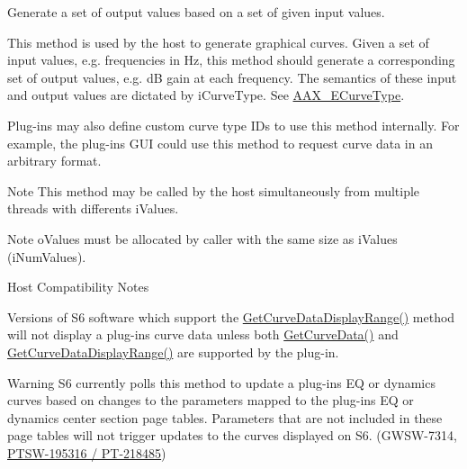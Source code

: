 Generate a set of output values based on a set of given input values. 

This method is used by the host to generate graphical curves. Given a set of input values, e.\+g. frequencies in Hz, this method should generate a corresponding set of output values, e.\+g. d\+B gain at each frequency. The semantics of these input and output values are dictated by {\ttfamily i\+Curve\+Type}. See \hyperlink{a00342_ga59c73d8f51c5c55d54a728eff39da884}{A\+A\+X\+\_\+\+E\+Curve\+Type}.

Plug-\/ins may also define custom curve type I\+Ds to use this method internally. For example, the plug-\/in\textquotesingle{}s G\+U\+I could use this method to request curve data in an arbitrary format.


\begin{DoxyItemize}
\item \begin{DoxyNote}{Note}
This method may be called by the host simultaneously from multiple threads with differents {\ttfamily i\+Values}.
\end{DoxyNote}

\item \begin{DoxyNote}{Note}
{\ttfamily o\+Values} must be allocated by caller with the same size as {\ttfamily i\+Values} ({\ttfamily i\+Num\+Values}).
\end{DoxyNote}
\begin{DoxyRefDesc}{Host Compatibility Notes}
\item[\hyperlink{a00380__compatibility_notes000050}{Host Compatibility Notes}]Versions of S6 software which support the \hyperlink{a00342_ga38d1ac0c15a7052904077ef0e2527e0d}{Get\+Curve\+Data\+Display\+Range()} method will not display a plug-\/in\textquotesingle{}s curve data unless both \hyperlink{a00342_gaa85bda4027342eb644a9c92a17da6d49}{Get\+Curve\+Data()} and \hyperlink{a00342_ga38d1ac0c15a7052904077ef0e2527e0d}{Get\+Curve\+Data\+Display\+Range()} are supported by the plug-\/in.\end{DoxyRefDesc}

\end{DoxyItemize}

\begin{DoxyWarning}{Warning}
S6 currently polls this method to update a plug-\/in\textquotesingle{}s E\+Q or dynamics curves based on changes to the parameters mapped to the plug-\/in\textquotesingle{}s E\+Q or dynamics center section page tables. Parameters that are not included in these page tables will not trigger updates to the curves displayed on S6. (G\+W\+S\+W-\/7314, \hyperlink{a00374_PTSW-195316}{P\+T\+S\+W-\/195316 / P\+T-\/218485})
\end{DoxyWarning}

